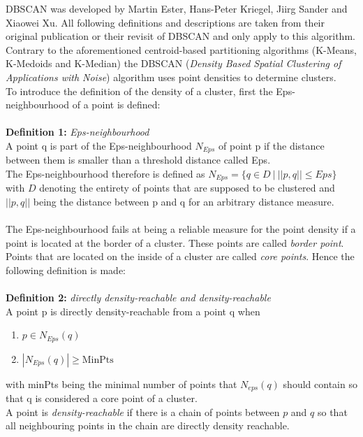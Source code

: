 
DBSCAN was developed by Martin Ester, Hans-Peter Kriegel, Jiirg Sander and Xiaowei Xu. All following definitions and descriptions are taken from their original publication \cite{dbscan} or their revisit of DBSCAN \cite{dbscanrevisited} and only apply to this algorithm.\\
Contrary to the aforementioned centroid-based partitioning algorithms (K-Means, K-Medoids and K-Median) the DBSCAN (\textit{Density Based Spatial Clustering of Applications with Noise}) algorithm uses point densities to determine clusters.\\
To introduce the definition of the density of a cluster, first the Eps-neighbourhood of a point is defined:\\
\ \\
\textbf{Definition 1:} \textit{Eps-neighbourhood}\\
A point q is part of the Eps-neighbourhood $N_{Eps}$ of point p if the distance between them is smaller than a threshold distance called Eps.\\
The Eps-neighbourhood therefore is defined as $N_{Eps} = \{q \in D \ | \ ||p, q|| \leq Eps \}$ with $D$ denoting the entirety of points that are supposed to be clustered and $||p, q||$ being the distance between p and q for an arbitrary distance measure.\\
\ \\
The Eps-neighbourhood fails at being a reliable measure for the point density if a point is located at the border of a cluster. These points are called \textit{border point}. Points that are located on the inside of a cluster are called \textit{core points}. Hence the following definition is made:\\
\ \\
\textbf{Definition 2:} \textit{directly density-reachable and density-reachable}\\
A point p is directly density-reachable from a point q when
\begin{enumerate}
    \item $p \in N_{Eps}(q)$
    \item $|N_{Eps}(q)| \geq \text{MinPts}$
\end{enumerate}
with \acrshort{minPts} being the minimal number of points that $N_{eps}(q)$ should contain so that q is considered a core point of a cluster.\\
A point is \textit{density-reachable} if there is a chain of points between $p$ and $q$ so that all neighbouring points in the chain are directly density reachable.\\
